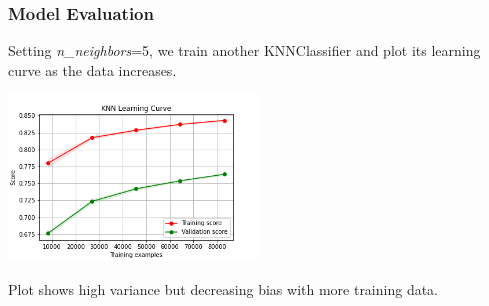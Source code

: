 \subsubsection{Model Evaluation}
Setting \emph{n\_neighbors}=5, we train another KNNClassifier and plot its learning curve as the data increases.
\begin{center}
    \captionsetup{type=figure}
    \includegraphics[width=250px]{learning_curve_knn.png}
\end{center}
Plot shows high variance but decreasing bias with more training data.
